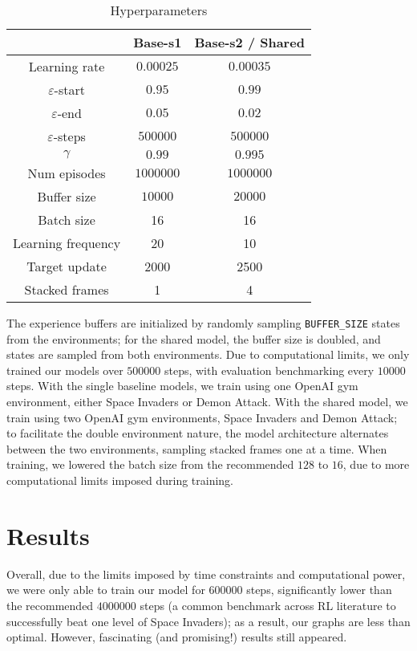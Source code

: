\documentclass{article} %
\begin{document}
\begin{table}[htpb]
  \centering
  \caption{Hyperparameters}
  \begin{tabular}{||c | c | c||}
    \hline
   & Base-s1 & Base-s2 / Shared \\
   \hline\hline
    Learning rate & $0.00025$ & $0.00035$ \\
    \hline
    $\varepsilon$-start & $0.95$ & $0.99$ \\
    \hline
    $\varepsilon$-end & $0.05$ & $0.02$ \\
    \hline
    $\varepsilon$-steps & $500000$ & $500000$ \\
    \hline
    $\gamma$ & $0.99$ & $0.995$ \\
    \hline
    Num episodes & $1000000$ & $1000000$ \\
    \hline
    Buffer size & $10000$ & $20000$ \\
    \hline
    Batch size & 16 & 16 \\
    \hline
    Learning frequency & 20 & 10 \\
    \hline
    Target update & 2000 & 2500 \\
    \hline
    Stacked frames & 1 & 4\\
    \hline
  \end{tabular}
  \label{table:hyperparameters}
\end{table}

The experience buffers are initialized by randomly sampling \texttt{BUFFER\_SIZE} states from the
environments; for the shared model, the buffer size is doubled, and states are sampled from both
environments. Due to computational limits, we only trained our models over $500000$ steps, with
evaluation benchmarking every $10000$ steps. With the single baseline models, we train using one
OpenAI gym environment, either Space Invaders or Demon Attack. With the shared model, we train using
two OpenAI gym environments, Space Invaders and Demon Attack; to facilitate the double environment
nature, the model architecture alternates between the two environments, sampling stacked frames one
at a time. When training, we lowered the batch size from the recommended $128$ to $16$, due to more
computational limits imposed during training.


\section{Results}

Overall, due to the limits imposed by time constraints and computational power, we were only able to
train our model for $600000$ steps, significantly lower than the recommended $4000000$ steps (a
common benchmark across RL literature to successfully beat one level of Space Invaders); as a
result, our graphs are less than optimal. However, fascinating (and promising!) results still
appeared.
\end{document}
